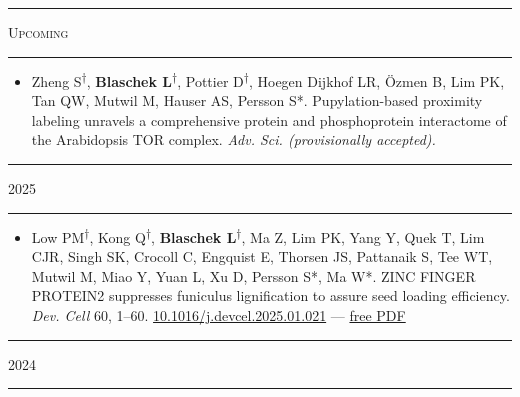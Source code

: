 \documentclass[11pt]{article}
\newcommand*{\xdash}[1][3em]{\rule[0.5ex]{#1}{0.55pt}}
\begin{document}
\hspace*{\fill} \xdash[6em] \large{\textsc{Upcoming}} \xdash[6em] \hspace*{\fill} \normalsize

\vspace{-0.175cm}	
\begin{itemize}[label={},itemindent=-9pt,leftmargin=24pt]
	\itemsep-0.1cm
	\item Zheng S\textsuperscript{$\dagger$}, \textbf{Blaschek L}\textsuperscript{$\dagger$}, Pottier D\textsuperscript{$\dagger$}, Hoegen Dijkhof LR, Özmen B, Lim PK, Tan QW, Mutwil M, Hauser AS, Persson S*. Pupylation-based proximity labeling unravels a comprehensive protein and phosphoprotein interactome of the Arabidopsis TOR complex. \textit{Adv. Sci. (provisionally accepted).}
\end{itemize}

\hspace*{\fill} \xdash[6em] \large{\textsc{2025}} \xdash[6em] \hspace*{\fill} \normalsize

\vspace{-0.175cm}	
\begin{itemize}[label={},itemindent=-9pt,leftmargin=24pt]
	\itemsep-0.1cm
	\item Low PM\textsuperscript{$\dagger$}, Kong Q\textsuperscript{$\dagger$}, \textbf{Blaschek L}\textsuperscript{$\dagger$}, Ma Z, Lim PK, Yang Y, Quek T, Lim CJR, Singh SK, Crocoll C, Engquist E, Thorsen JS, Pattanaik S, Tee WT, Mutwil M, Miao Y, Yuan L, Xu D, Persson S*, Ma W*. ZINC FINGER PROTEIN2 suppresses funiculus lignification to assure seed loading efficiency. \textit{Dev. Cell} 60, 1–60. \href{https://doi.org/10.1016/j.devcel.2025.01.021}{10.1016/j.devcel.2025.01.021} — \href{https://leonardblaschek.github.io/assets/pdf/10_1016_j_devcel_2025_01_021.pdf}{free PDF}
\end{itemize}

\hspace*{\fill} \xdash[6em] \large{\textsc{2024}} \xdash[6em] \hspace*{\fill} \normalsize
\end{document}
